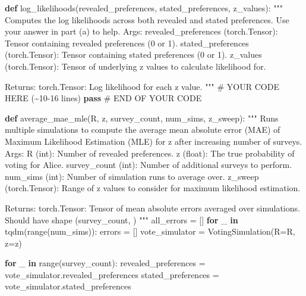 \documentclass[
  letterpaper,
  numbers=noenddot,
  DIV=11,
  oneside]{scrreprt}
\newenvironment{Shaded}{\begin{snugshade}}{\end{snugshade}}
\newcommand{\BuiltInTok}[1]{\textcolor[rgb]{0.00,0.23,0.31}{#1}}
\newcommand{\CommentTok}[1]{\textcolor[rgb]{0.37,0.37,0.37}{#1}}
\newcommand{\ControlFlowTok}[1]{\textcolor[rgb]{0.00,0.23,0.31}{\textbf{#1}}}
\newcommand{\KeywordTok}[1]{\textcolor[rgb]{0.00,0.23,0.31}{\textbf{#1}}}
\newcommand{\NormalTok}[1]{\textcolor[rgb]{0.00,0.23,0.31}{#1}}
\newcommand{\OperatorTok}[1]{\textcolor[rgb]{0.37,0.37,0.37}{#1}}
\newcommand{\RegionMarkerTok}[1]{\textcolor[rgb]{0.00,0.23,0.31}{#1}}
\theoremstyle{remark}
\begin{document}
\begin{Shaded}
\begin{Highlighting}[numbers=left,,]
\KeywordTok{def}\NormalTok{ log\_likelihoods(revealed\_preferences, stated\_preferences, z\_values):}
    \CommentTok{"""}
\CommentTok{    Computes the log likelihoods across both revealed and stated preferences.}
\CommentTok{    Use your answer in part (a) to help.}
\CommentTok{    }
\CommentTok{    Args:}
\CommentTok{        revealed\_preferences (torch.Tensor): Tensor containing revealed preferences (0 or 1).}
\CommentTok{        stated\_preferences (torch.Tensor): Tensor containing stated preferences (0 or 1).}
\CommentTok{        z\_values (torch.Tensor): Tensor of underlying z values to calculate likelihood for.}

\CommentTok{    Returns:}
\CommentTok{        torch.Tensor: Log likelihood for each z value.}
\CommentTok{    """}
    \CommentTok{\# YOUR CODE HERE (\textasciitilde{}10{-}16 lines)}
    \ControlFlowTok{pass}
    \CommentTok{\# }\RegionMarkerTok{END}\CommentTok{ OF YOUR CODE }

\KeywordTok{def}\NormalTok{ average\_mae\_mle(R, z, survey\_count, num\_sims, z\_sweep):}
    \CommentTok{"""}
\CommentTok{    Runs multiple simulations to compute the average mean absolute error (MAE) of Maximum Likelihood Estimation (MLE) }
\CommentTok{    for z after increasing number of surveys.}
\CommentTok{    }
\CommentTok{    Args:}
\CommentTok{        R (int): Number of revealed preferences.}
\CommentTok{        z (float): The true probability of voting for Alice.}
\CommentTok{        survey\_count (int): Number of additional surveys to perform.}
\CommentTok{        num\_sims (int): Number of simulation runs to average over.}
\CommentTok{        z\_sweep (torch.Tensor): Range of z values to consider for maximum likelihood estimation.}

\CommentTok{    Returns:}
\CommentTok{        torch.Tensor: Tensor of mean absolute errors averaged over simulations.}
\CommentTok{                      Should have shape (survey\_count, )}
\CommentTok{    """}
\NormalTok{    all\_errors }\OperatorTok{=}\NormalTok{ []}
    \ControlFlowTok{for}\NormalTok{ \_ }\KeywordTok{in}\NormalTok{ tqdm(}\BuiltInTok{range}\NormalTok{(num\_sims)):}
\NormalTok{        errors }\OperatorTok{=}\NormalTok{ []}
\NormalTok{        vote\_simulator }\OperatorTok{=}\NormalTok{ VotingSimulation(R}\OperatorTok{=}\NormalTok{R, z}\OperatorTok{=}\NormalTok{z)}

        \ControlFlowTok{for}\NormalTok{ \_ }\KeywordTok{in} \BuiltInTok{range}\NormalTok{(survey\_count):}
\NormalTok{            revealed\_preferences }\OperatorTok{=}\NormalTok{ vote\_simulator.revealed\_preferences}
\NormalTok{            stated\_preferences }\OperatorTok{=}\NormalTok{ vote\_simulator.stated\_preferences}


\end{Highlighting}
\end{Shaded}
\end{document}
